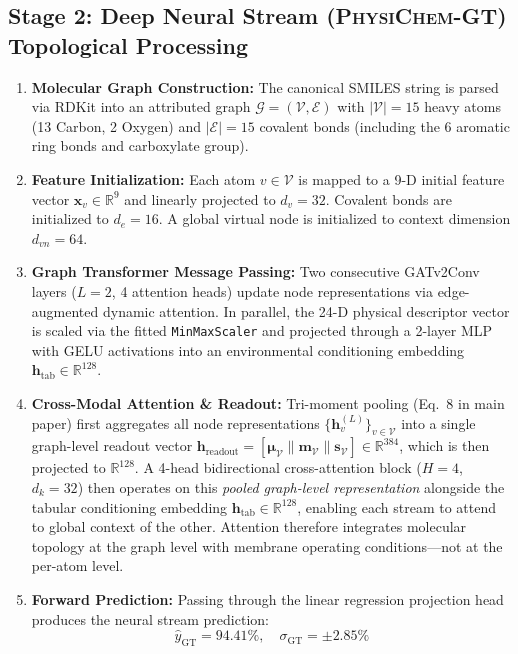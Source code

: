 \documentclass[11pt]{article}
\begin{document}
\subsection{Stage 2: Deep Neural Stream (\textsc{PhysiChem-GT}) Topological Processing}
\label{sec:walkthrough_gt}

\begin{enumerate}[leftmargin=1.0cm]
    \item \textbf{Molecular Graph Construction:} The canonical SMILES string is parsed via RDKit into an attributed graph $\mathcal{G} = (\mathcal{V}, \mathcal{E})$ with $|\mathcal{V}| = 15$ heavy atoms (13 Carbon, 2 Oxygen) and $|\mathcal{E}| = 15$ covalent bonds (including the 6 aromatic ring bonds and carboxylate group).
    \item \textbf{Feature Initialization:} Each atom $v \in \mathcal{V}$ is mapped to a 9-D initial feature vector $\mathbf{x}_v \in \mathbb{R}^9$ and linearly projected to $d_v = 32$. Covalent bonds are initialized to $d_e = 16$. A global virtual node is initialized to context dimension $d_{vn} = 64$.
    \item \textbf{Graph Transformer Message Passing:} Two consecutive GATv2Conv layers ($L = 2$, 4 attention heads) update node representations via edge-augmented dynamic attention. In parallel, the 24-D physical descriptor vector is scaled via the fitted \texttt{MinMaxScaler} and projected through a 2-layer MLP with GELU activations into an environmental conditioning embedding $\mathbf{h}_{\mathrm{tab}} \in \mathbb{R}^{128}$.
    \item \textbf{Cross-Modal Attention \& Readout:} Tri-moment pooling (Eq.~8 in main paper) first aggregates all node representations $\{\mathbf{h}_v^{(L)}\}_{v \in \mathcal{V}}$ into a single graph-level readout vector $\mathbf{h}_{\mathrm{readout}} = [\boldsymbol{\mu}_{\mathcal{V}} \parallel \mathbf{m}_{\mathcal{V}} \parallel \mathbf{s}_{\mathcal{V}}] \in \mathbb{R}^{384}$, which is then projected to $\mathbb{R}^{128}$. A 4-head bidirectional cross-attention block ($H = 4$, $d_k = 32$) then operates on this \emph{pooled graph-level representation} alongside the tabular conditioning embedding $\mathbf{h}_{\mathrm{tab}} \in \mathbb{R}^{128}$, enabling each stream to attend to global context of the other. Attention therefore integrates molecular topology at the graph level with membrane operating conditions—not at the per-atom level.
    \item \textbf{Forward Prediction:} Passing through the linear regression projection head produces the neural stream prediction:
    \begin{equation}
    \hat{y}_{\mathrm{GT}} = 94.41\%, \quad \sigma_{\mathrm{GT}} = \pm 2.85\%
    \end{equation}
\end{enumerate}
\end{document}

